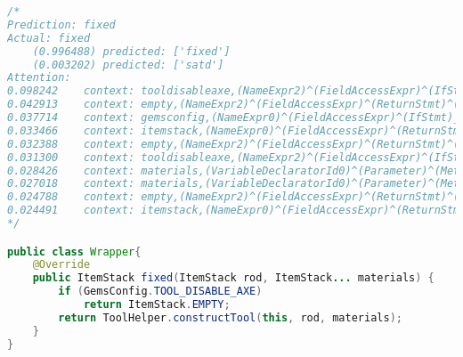 \begin{lstlisting}[basicstyle=\tiny,caption={Case-3 fixed}, label={},language=Java,breaklines=true,
  postbreak=\mbox{\textcolor{red}{$\hookrightarrow$}\space}]
/*
Prediction:	fixed
Actual:	fixed
	(0.996488) predicted: ['fixed']
	(0.003202) predicted: ['satd']
Attention:
0.098242	context: tooldisableaxe,(NameExpr2)^(FieldAccessExpr)^(IfStmt)_(ReturnStmt)_(FieldAccessExpr0)_(NameExpr0),itemstack
0.042913	context: empty,(NameExpr2)^(FieldAccessExpr)^(ReturnStmt)^(IfStmt)^(BlockStmt)_(ReturnStmt)_(MethodCallExpr0)_(NameExpr5),constructtool
0.037714	context: gemsconfig,(NameExpr0)^(FieldAccessExpr)^(IfStmt)_(ReturnStmt)_(FieldAccessExpr0)_(NameExpr0),itemstack
0.033466	context: itemstack,(NameExpr0)^(FieldAccessExpr)^(ReturnStmt)^(IfStmt)^(BlockStmt)_(ReturnStmt)_(MethodCallExpr0)_(NameExpr5),constructtool
0.032388	context: empty,(NameExpr2)^(FieldAccessExpr)^(ReturnStmt)^(IfStmt)^(BlockStmt)_(ReturnStmt)_(MethodCallExpr0)_(NameExpr4),materials
0.031300	context: tooldisableaxe,(NameExpr2)^(FieldAccessExpr)^(IfStmt)^(BlockStmt)_(ReturnStmt)_(MethodCallExpr0)_(NameExpr5),constructtool
0.028426	context: materials,(VariableDeclaratorId0)^(Parameter)^(MethodDeclaration)_(BlockStmt)_(IfStmt)_(FieldAccessExpr0)_(NameExpr2),tooldisableaxe
0.027018	context: materials,(VariableDeclaratorId0)^(Parameter)^(MethodDeclaration)_(BlockStmt)_(IfStmt)_(ReturnStmt)_(FieldAccessExpr0)_(NameExpr0),itemstack
0.024788	context: empty,(NameExpr2)^(FieldAccessExpr)^(ReturnStmt)^(IfStmt)^(BlockStmt)_(ReturnStmt)_(MethodCallExpr0)_(ThisExpr2),this
0.024491	context: itemstack,(NameExpr0)^(FieldAccessExpr)^(ReturnStmt)^(IfStmt)^(BlockStmt)_(ReturnStmt)_(MethodCallExpr0)_(NameExpr4),materials
*/

public class Wrapper{
    @Override
    public ItemStack fixed(ItemStack rod, ItemStack... materials) {
        if (GemsConfig.TOOL_DISABLE_AXE)
            return ItemStack.EMPTY;
        return ToolHelper.constructTool(this, rod, materials);
    }
}
\end{lstlisting}

